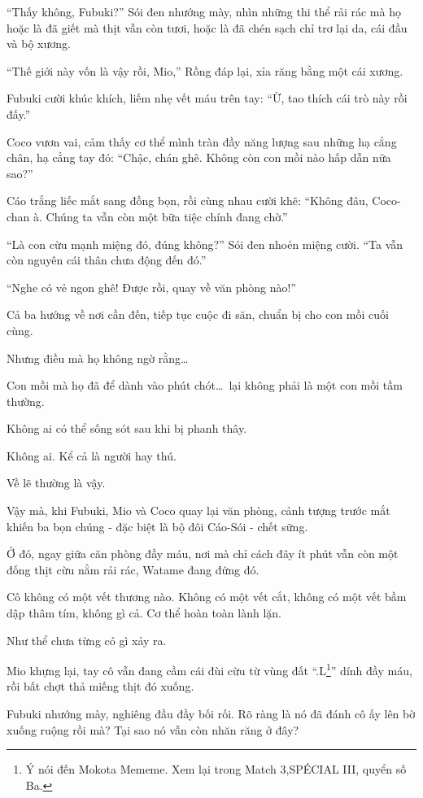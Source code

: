 \documentclass[../main.tex]{subfiles}
\begin{document}
``Thấy không, Fubuki?'' Sói đen nhướng mày, nhìn những thi thể rải rác mà họ hoặc là đã giết mà thịt vẫn còn tươi, hoặc là đã chén sạch chỉ trơ lại da, cái đầu và bộ xương.

``Thế giới này vốn là vậy rồi, Mio,'' Rồng đáp lại, xỉa răng bằng một cái xương.

Fubuki cười khúc khích, liếm nhẹ vết máu trên tay: ``Ừ, tao thích cái trò này rồi đấy.''

Coco vươn vai, cảm thấy cơ thể mình tràn đầy năng lượng sau những hạ cẳng chân, hạ cẳng tay đó: ``Chậc, chán ghê. Không còn con mồi nào hấp dẫn nữa sao?''

Cáo trắng liếc mắt sang đồng bọn, rồi cùng nhau cười khẽ: ``Không đâu, Coco-chan à. Chúng ta vẫn còn một bữa tiệc chính đang chờ.''

``Là con cừu mạnh miệng đó, đúng không?'' Sói đen nhoẻn miệng cười. ``Ta vẫn còn nguyên cái thân chưa động đến đó.''

``Nghe có vẻ ngon ghê! Được rồi, quay về văn phòng nào!''

Cả ba hướng về nơi cần đến, tiếp tục cuộc đi săn, chuẩn bị cho con mồi cuối cùng.

Nhưng điều mà họ không ngờ rằng\dots

Con mồi mà họ đã để dành vào phút chót\dots\ lại không phải là một con mồi tầm thường.

\ct

Không ai có thể sống sót sau khi bị phanh thây.

Không ai. Kể cả là người hay thú.

Về lẽ thường là vậy.

Vậy mà, khi Fubuki, Mio và Coco quay lại văn phòng, cảnh tượng trước mắt khiến ba bọn chúng - đặc biệt là bộ đôi Cáo-Sói -  chết sững.

Ở đó, ngay giữa căn phòng đầy máu, nơi mà chỉ cách đây ít phút vẫn còn một đống thịt cừu nằm rải rác, Watame đang đứng đó.

Cô không có một vết thương nào. Không có một vết cắt, không có một vết bầm dập thâm tím, không gì cả. Cơ thể hoàn toàn lành lặn.

Như thể chưa từng có gì xảy ra.

Mio khựng lại, tay cô vẫn đang cầm cái đùi cừu từ vùng đất ``.L\footnote{Ý nói đến Mokota Mememe. Xem lại trong {\sen Match 3},{\flaregothic SPÉCIAL {\ab III}}, quyển số Ba.}'' dính đầy máu, rồi bất chợt thả miếng thịt đó xuống.

Fubuki nhướng mày, nghiêng đầu đầy bối rối. Rõ ràng là nó đã đánh cô ấy lên bờ xuống ruộng rồi mà? Tại sao nó vẫn còn nhăn răng ở đây?
\end{document}
